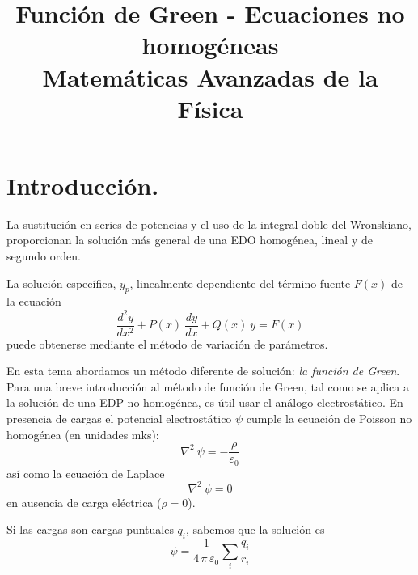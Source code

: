 
\usepackage{standalone}
\newtheorem{defi}{{\it Definición}}[section]
\newtheorem{ejemplo}{{\it Ejemplo}}[section]

\title{Función de Green - Ecuaciones no homogéneas \\ \large {Matemáticas Avanzadas de la Física}}
\date{}

\renewcommand\labelenumii{\theenumi.{\arabic{enumii}}}
\maketitle
\fontsize{14}{14}\selectfont
\section{Introducción.}
La sustitución en series de potencias y el uso de la integral doble del Wronskiano, proporcionan la solución más general de una EDO homogénea, lineal y de segundo orden. 
\par
La solución específica, $y_{p}$, linealmente dependiente del término fuente $F (x)$ de la ecuación
\begin{equation}
\dfrac{d^{2} y}{d x^{2}} +  P(x) \: \dfrac{d y}{d x} + Q(x) \: y = F(x)
\label{eq:ecuacion_09_82}
\end{equation}
puede obtenerse mediante el método de variación de parámetros.
\par
En esta tema abordamos un método diferente de solución: \emph{la función de Green}. Para una breve introducción al método de función de Green, tal como se aplica a la solución de una EDP no homogénea, es útil usar el análogo electrostático. En presencia de cargas el potencial electrostático $\psi$ cumple la ecuación de Poisson no homogénea (en unidades mks):
\begin{equation}
\nabla^{2} \: \psi = - \dfrac{\rho}{\varepsilon_{0}}
\label{eq:ecuacion_09_143}
\end{equation}
así como la ecuación de Laplace
\begin{equation}
\nabla^{2} \: \psi = 0
\label{eq:ecuacion_09_144}
\end{equation}
en ausencia de carga eléctrica ($\rho = 0$).
\par
Si las cargas son cargas puntuales $q_{i}$, sabemos que la solución es
\begin{equation}
\psi = \dfrac{1}{4 \, \pi \, \varepsilon_{0}} \sum_{i} \dfrac{q_{i}}{r_{i}}
\label{eq:ecuacion_09_145}
\end{equation}
